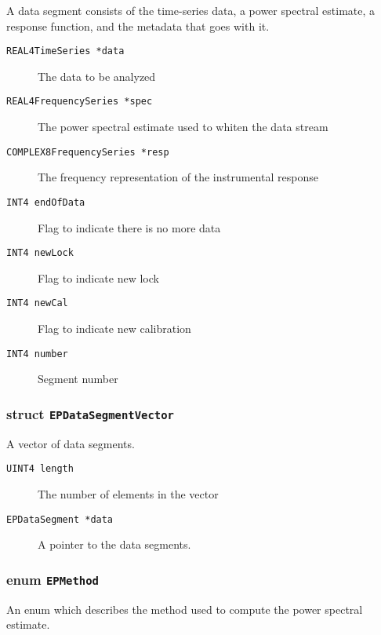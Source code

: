 \noindent A data segment consists of the time-series data,  a power
spectral estimate,  a response function,  and the metadata that goes
with it.

\begin{description}
\item[\texttt{REAL4TimeSeries              *data}] The data to be
analyzed
\item[\texttt{REAL4FrequencySeries         *spec}] The power spectral
estimate used to whiten the data stream
\item[\texttt{COMPLEX8FrequencySeries      *resp}] The frequency
representation of the instrumental response
\item[\texttt{INT4                          endOfData}] Flag to
indicate there is no more data
\item[\texttt{INT4                          newLock}] Flag to indicate
new lock
\item[\texttt{INT4                          newCal}] Flag to indicate
new calibration
\item[\texttt{INT4                          number}] Segment number
\end{description}

\subsubsection*{struct \texttt{EPDataSegmentVector}}

\noindent A vector of data segments.

\begin{description}
\item[\texttt{UINT4                         length}] The number of
elements in the vector
\item[\texttt{EPDataSegment                  *data}] A pointer to the
data segments.
\end{description}

\subsubsection*{enum \texttt{EPMethod}}

\noindent An enum which describes the method used to compute the power
spectral estimate.

